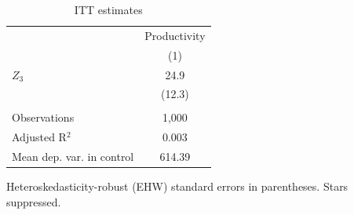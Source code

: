 
\begin{table}[htbp]
   \caption{\label{tab:itt} ITT estimates}
   \bigskip
   \centering
   \begin{tabular}{lc}
      \toprule
                                & Productivity \\   
                                & (1)\\  
      \midrule 
      $Z_3$                     & 24.9\\   
                                & (12.3)\\   
       \\
      Observations              & 1,000\\  
      Adjusted R$^2$            & 0.003\\  
      Mean dep. var. in control & 614.39\\  
      \bottomrule
   \end{tabular}
   
   \par \raggedright 
   Heteroskedasticity-robust (EHW) standard errors in parentheses. Stars suppressed.
\end{table}


